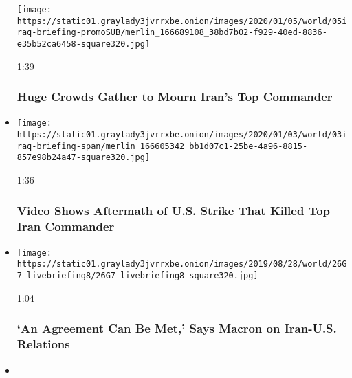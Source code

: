 \begin{itemize}
  \texttt{[image: https://static01.graylady3jvrrxbe.onion/images/2020/01/05/world/05iraq-briefing-promoSUB/merlin\_166689108\_38bd7b02-f929-40ed-8836-e35b52ca6458-square320.jpg]}

  1:39

  \hypertarget{huge-crowds-gather-to-mourn-irans-top-commander}{%
  \subsubsection{Huge Crowds Gather to Mourn Iran's Top
  Commander}\label{huge-crowds-gather-to-mourn-irans-top-commander}}
\item
  \href{https://www.nytimes3xbfgragh.onion/video/world/middleeast/100000006902165/baghdad-airport-strike-reaction-soleimani.html?action=click\&module=video-series-bar\&region=header\&pgtype=Article\&playlistId=video/us-iran-relations}{}

  \texttt{[image: https://static01.graylady3jvrrxbe.onion/images/2020/01/03/world/03iraq-briefing-span/merlin\_166605342\_bb1d07c1-25be-4a96-8815-857e98b24a47-square320.jpg]}

  1:36

  \hypertarget{video-shows-aftermath-of-us-strike-that-killed-top-iran-commander}{%
  \subsubsection{Video Shows Aftermath of U.S. Strike That Killed Top
  Iran
  Commander}\label{video-shows-aftermath-of-us-strike-that-killed-top-iran-commander}}
\item
  \href{https://www.nytimes3xbfgragh.onion/video/world/europe/100000006681185/trump-macron-iran.html?action=click\&module=video-series-bar\&region=header\&pgtype=Article\&playlistId=video/us-iran-relations}{}

  \texttt{[image: https://static01.graylady3jvrrxbe.onion/images/2019/08/28/world/26G7-livebriefing8/26G7-livebriefing8-square320.jpg]}

  1:04

  \hypertarget{an-agreement-can-be-met-says-macron-on-iran-us-relations}{%
  \subsubsection{`An Agreement Can Be Met,' Says Macron on Iran-U.S.
  Relations}\label{an-agreement-can-be-met-says-macron-on-iran-us-relations}}
\item
  \href{https://www.nytimes3xbfgragh.onion/video/world/middleeast/100000006621764/iran-british-tanker.html?action=click\&module=video-series-bar\&region=header\&pgtype=Article\&playlistId=video/us-iran-relations}{}


\end{itemize}
